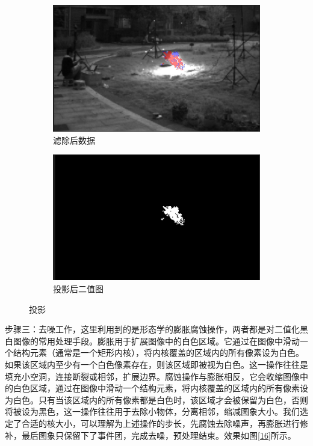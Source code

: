 \begin{figure}[ht]
    \centering
    \begin{subfigure}{0.49\textwidth}
        \centering
        \includegraphics[width=\textwidth]{figures/extract_process_02.png}
        \caption{滤除后数据}
        \label{15.a}
    \end{subfigure}
    \hfill
    \begin{subfigure}{0.49\textwidth}
        \centering
        \includegraphics[width=\textwidth]{figures/extract_process_03.png}
        \caption{投影后二值图}
        \label{15.b}
    \end{subfigure}
    \caption{投影}
    \label{15}
\end{figure}

步骤三：去噪工作，这里利用到的是形态学的膨胀腐蚀操作，两者都是对二值化黑白图像的常用处理手段。膨胀用于扩展图像中的白色区域。它通过在图像中滑动一个结构元素（通常是一个矩形内核），将内核覆盖的区域内的所有像素设为白色。如果该区域内至少有一个白色像素存在，则该区域即被视为白色。这一操作往往是填充小空洞，连接断裂或相邻，扩展边界。腐蚀操作与膨胀相反，它会收缩图像中的白色区域，通过在图像中滑动一个结构元素，将内核覆盖的区域内的所有像素设为白色。只有当该区域内的所有像素都是白色时，该区域才会被保留为白色，否则将被设为黑色，这一操作往往用于去除小物体，分离相邻，缩减图象大小。我们选定了合适的核大小，可以理解为上述操作的步长，先腐蚀去除噪声，再膨胀进行修补，最后图象只保留下了事件团，完成去噪，预处理结束。效果如图\ref{16}所示。

